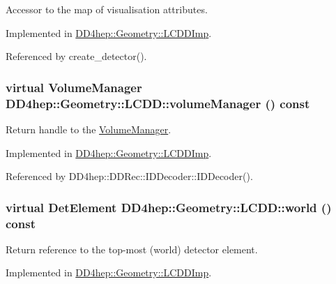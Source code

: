 Accessor to the map of visualisation attributes. 

Implemented in \hyperlink{class_d_d4hep_1_1_geometry_1_1_l_c_d_d_imp_a7ba04b265420787088b76beea40c5733}{DD4hep::Geometry::LCDDImp}.

Referenced by create\_\-detector().\hypertarget{class_d_d4hep_1_1_geometry_1_1_l_c_d_d_a2112b2267f5f07ecc94e909d696ffdbd}{
\subsubsection[{volumeManager}]{\setlength{\rightskip}{0pt plus 5cm}virtual {\bf VolumeManager} DD4hep::Geometry::LCDD::volumeManager () const}}
\label{class_d_d4hep_1_1_geometry_1_1_l_c_d_d_a2112b2267f5f07ecc94e909d696ffdbd}


Return handle to the \hyperlink{class_d_d4hep_1_1_geometry_1_1_volume_manager}{VolumeManager}. 

Implemented in \hyperlink{class_d_d4hep_1_1_geometry_1_1_l_c_d_d_imp_a43a6947e79f1d935cae13ffa14dec807}{DD4hep::Geometry::LCDDImp}.

Referenced by DD4hep::DDRec::IDDecoder::IDDecoder().\hypertarget{class_d_d4hep_1_1_geometry_1_1_l_c_d_d_ae61d027023791272cf976432c0b3a977}{
\subsubsection[{world}]{\setlength{\rightskip}{0pt plus 5cm}virtual {\bf DetElement} DD4hep::Geometry::LCDD::world () const}}
\label{class_d_d4hep_1_1_geometry_1_1_l_c_d_d_ae61d027023791272cf976432c0b3a977}


Return reference to the top-\/most (world) detector element. 

Implemented in \hyperlink{class_d_d4hep_1_1_geometry_1_1_l_c_d_d_imp_a8aeb5997ee6b66d4207ccab82c2bf8f1}{DD4hep::Geometry::LCDDImp}.


